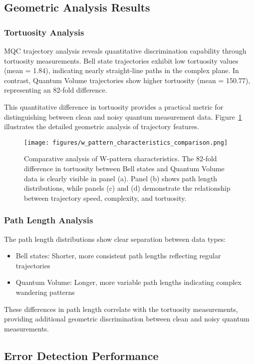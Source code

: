 \subsection{Geometric Analysis Results}

\subsubsection{Tortuosity Analysis}
MQC trajectory analysis reveals quantitative discrimination capability through tortuosity measurements. Bell state trajectories exhibit low tortuosity values (mean = 1.84), indicating nearly straight-line paths in the complex plane. In contrast, Quantum Volume trajectories show higher tortuosity (mean = 150.77), representing an 82-fold difference.

This quantitative difference in tortuosity provides a practical metric for distinguishing between clean and noisy quantum measurement data. Figure~\ref{fig:w_pattern} illustrates the detailed geometric analysis of trajectory features.

\begin{figure}[htb]
\centering
\texttt{[image: figures/w\_pattern\_characteristics\_comparison.png]}
\caption{Comparative analysis of W-pattern characteristics. The 82-fold difference in tortuosity between Bell states and Quantum Volume data is clearly visible in panel (a). Panel (b) shows path length distributions, while panels (c) and (d) demonstrate the relationship between trajectory speed, complexity, and tortuosity.}
\label{fig:w_pattern}
\end{figure}

\subsubsection{Path Length Analysis}
The path length distributions show clear separation between data types:
\begin{itemize}
\item Bell states: Shorter, more consistent path lengths reflecting regular trajectories
\item Quantum Volume: Longer, more variable path lengths indicating complex wandering patterns
\end{itemize}

These differences in path length correlate with the tortuosity measurements, providing additional geometric discrimination between clean and noisy quantum measurements.

\subsection{Error Detection Performance}

